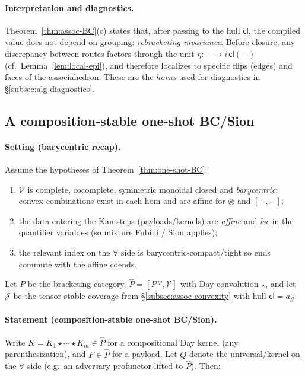 \documentclass[11pt]{article}
\numberwithin{equation}{section}
\theoremstyle{upright}
\newcommand{\V}{\mathcal{V}}
\begin{document}
\paragraph{Interpretation and diagnostics.}
Theorem~\ref{thm:assoc-BC}(c) states that, after passing to the hull $\mathsf{cl}$,
the compiled value does not depend on grouping: \emph{rebracketing invariance}.
Before closure, any discrepancy between routes factors through the unit
$\eta: -\to i\,\mathsf{cl}(-)$ (cf.\ Lemma~\ref{lem:local-epi}), and therefore
localizes to specific flips (edges) and faces of the associahedron. These are the
\emph{horns} used for diagnostics in \S\ref{subsec:alg-diagnostics}.

\subsection{A composition-stable one-shot BC/Sion}
\label{subsec:comp-bc-sion}

\paragraph{Setting (barycentric recap).}
Assume the hypotheses of Theorem~\ref{thm:one-shot-BC}:
\begin{enumerate}[label=(B\arabic*), itemsep=.25ex]
\item $\V$ is complete, cocomplete, symmetric monoidal closed and \emph{barycentric}:
  convex combinations exist in each hom and are affine for $\otimes$ and $[-,-]$;
\item the data entering the Kan steps (payloads/kernels) are \emph{affine} and \emph{lsc} in the
  quantifier variables (so mixture Fubini / Sion applies);
\item the relevant index on the $\forall$ side is barycentric-compact/tight so ends commute with the affine coends.
\end{enumerate}
Let $P$ be the bracketing category, $\widehat P=[P^{op},\V]$ with Day convolution $\star$,
and let $\mathcal J$ be the tensor-stable coverage from \S\ref{subsec:assoc-convexity} with hull
$\mathsf{cl}=a_{\mathcal J}$.

\paragraph{Statement (composition-stable one-shot BC/Sion).}
Write $K=K_1\star\cdots\star K_m\in\widehat P$ for a compositional Day kernel (any parenthesization),
and $F\in\widehat P$ for a payload. Let $Q$ denote the universal/kernel on the $\forall$-side
(e.g.\ an adversary profunctor lifted to $\widehat P$). Then:
\end{document}
